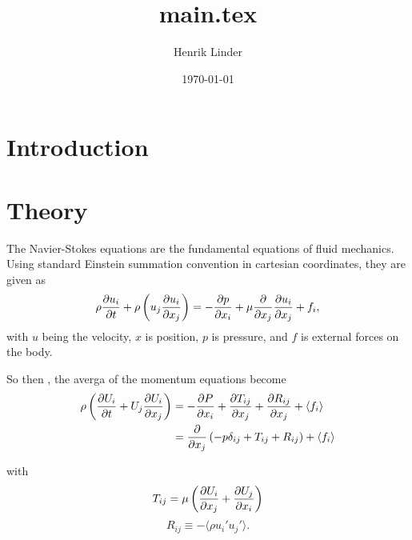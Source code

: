 \documentclass{article}
\title{main.tex }
\author{Henrik Linder}
\date{\today}
\begin{document}
\maketitle

\section{Introduction}


\section{Theory}
The Navier-Stokes equations are the fundamental equations of fluid mechanics. Using standard Einstein summation convention in cartesian coordinates, they are given as 
\begin{equation}
	\rho \pdv{u_{i}}{t} + \rho\left(u_{j}\pdv {u_{i}}{x_{j}}\right) = -\pdv{p}{x_{i}}+ \mu \pdv{x_{j}}\pdv{u_{i}}{x_{j}} + f_{i}, 
\end{equation}
with $u$ being the velocity, $x$ is position, $p$ is pressure, and $f$ is external forces on the body. 


So then , the averga of the momentum equations become 
\begin{equation}
	\begin{split}
		\rho \left(\pdv{U_{i}}{t}+U_{j}\pdv{U_{i}}{x_{j}}\right) &= -\pdv{P}{x_{i}} + \pdv{T_{ij}}{x_{j}} + \pdv{R_{ij}}{x_{j}} + \langle f_{i}\rangle \\&= \pdv{x_{j}}\left(-p\delta_{ij} + T_{ij} + R_{ij}\right) + \langle f_{i}\rangle
	\end{split}
\end{equation}

with 
\begin{equation}
	T_{ij} = \mu \left(\pdv{U_{i}}{x_{j}} + \pdv{U_{j}}{x_{i}}\right)
\end{equation}
\begin{equation}
	R_{ij} \equiv -\langle \rho u_{i}'u_{j}'\rangle.
\end{equation}
\end{document}
